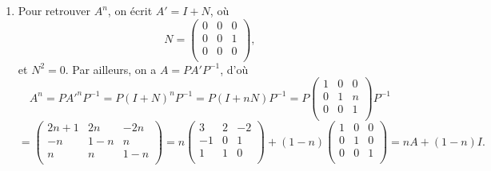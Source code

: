 {{\begin {enumerate}
\begin {enumerate}
$$A'=\begin{pmatrix}1&0&0 \\  0&1&1 \\ 0&0&1 \\ \end{pmatrix}.$$
La matrice de passage $P$ est \'egale \`a 
$$P=\begin{pmatrix}0&2&1 \\  1&-1&0 \\ 1&1&0 \\ \end{pmatrix}$$ et son inverse
$$P^{-1}=\begin{pmatrix}0&1/2&1/2 \\  0&-1/2&1/2 \\ 1&1&-1 \\ \end{pmatrix}.$$
    \item Pour retrouver $A^n$, on \'ecrit $A'=I+N$, o\`u
$$N=\begin{pmatrix}0&0&0 \\  0&0&1 \\ 0&0&0 \\ \end{pmatrix},$$
et $N^2=0$. Par ailleurs, on a $A=PA'P^{-1}$, d'o\`u 
$$A^n=PA'^nP^{-1}=P(I+N)^nP^{-1}=P(I+nN)P^{-1}=P\begin{pmatrix}1&0&0 \\  0&1&n \\ 0&0&1 \\ \end{pmatrix}P^{-1}$$
$$=\begin{pmatrix}2n+1&2n&-2n \\  -n&1-n&n \\  n&n&1-n \\ \end{pmatrix}=n\begin{pmatrix}3&2&-2 \\  -1&0&1 \\ 1&1&0 \\ \end{pmatrix}+(1-n)\begin{pmatrix}1&0&0 \\  0&1&0 \\ 0&0&1 \\ \end{pmatrix}=nA+(1-n)I.$$    
  \end {enumerate}
\end {enumerate}}
}
